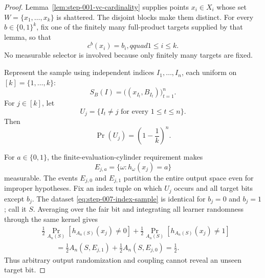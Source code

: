 \begin{proof}
Lemma~\ref{lem:step-001-vc-cardinality} supplies points \(x_i\in X_i\)
whose set \(W=\{x_1,\ldots,x_k\}\) is shattered.  The disjoint blocks make
them distinct.  For every \(b\in\{0,1\}^k\), fix one of the finitely many
full-product targets supplied by that lemma, so that
\begin{equation}\label{eq:step-007-target-labels}
c^b(x_i)=b_i,qquad1\le i\le k.
\end{equation}
No measurable selector is involved because only finitely many targets are
fixed.

Represent the sample using independent indices
\(I_1,\ldots,I_n\), each uniform on \([k]=\{1,\ldots,k\}\):
\begin{equation}\label{eq:step-007-index-sample}
S_B(I)=\bigl((x_{I_t},B_{I_t})\bigr)_{t=1}^n.
\end{equation}
For \(j\in[k]\), let
\begin{equation}\label{eq:step-007-unseen-event}
U_j=\{I_t\ne j\text{ for every }1\le t\le n\}.
\end{equation}
Then
\begin{equation}\label{eq:step-007-unseen-probability}
\Pr(U_j)=\left(1-\frac1k\right)^n.
\end{equation}

For \(a\in\{0,1\}\), the finite-evaluation-cylinder requirement makes
\begin{equation}\label{eq:step-007-evaluation-events}
E_{j,a}=\{\omega:h_\omega(x_j)=a\}
\end{equation}
measurable.  The events \(E_{j,0}\) and \(E_{j,1}\) partition the entire
output space even for improper hypotheses.  Fix an index tuple on which
\(U_j\) occurs and all target bits except \(b_j\).  The dataset
\eqref{eq:step-007-index-sample} is identical for \(b_j=0\) and \(b_j=1\);
call it \(S\).  Averaging over the fair bit and integrating all learner
randomness through the same kernel gives
\begin{equation}\label{eq:step-007-fair-unseen-bit}
\begin{split}
&\frac12\Pr_{A_n(S)}[h_{A_n(S)}(x_j)\ne0]
+\frac12\Pr_{A_n(S)}[h_{A_n(S)}(x_j)\ne1]\\
&\qquad=\frac12A_n(S,E_{j,1})+\frac12A_n(S,E_{j,0})
=\frac12.
\end{split}
\end{equation}
Thus arbitrary output randomization and coupling cannot reveal an unseen
target bit.


\end{proof}
